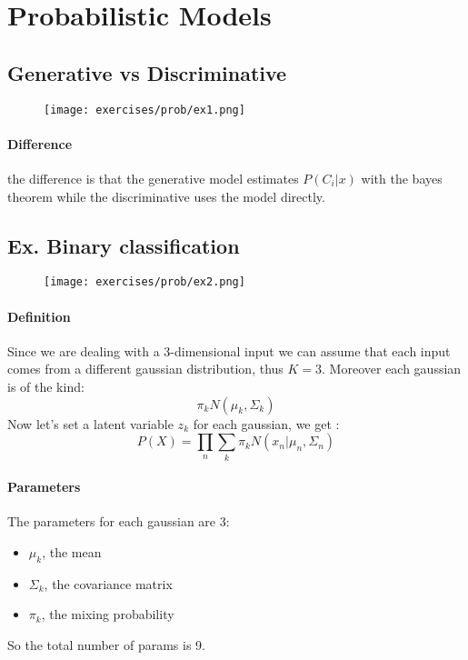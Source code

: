 \section{Probabilistic Models}

\subsection{Generative vs Discriminative}

\begin{figure}[H]
    \centering
    \texttt{[image: exercises/prob/ex1.png]}
\end{figure}

\paragraph{Difference}
the difference is that the generative model estimates $P(C_i|x)$ with the bayes theorem while the discriminative uses the model directly.


\subsection{Ex. Binary classification}

\begin{figure}[H]
    \centering
    \texttt{[image: exercises/prob/ex2.png]}
\end{figure}

\paragraph{Definition}
Since we are dealing with a 3-dimensional input we can assume that each input comes from a different gaussian distribution, thus $K=3$. Moreover each gaussian is of the kind:
$$\pi_k N(\mu_k,\Sigma_k)$$
Now let's set a latent variable $z_k$ for each gaussian, we get :
$$P(X)=\prod_n \sum_k \pi_k N(x_n|\mu_n,\Sigma_n)$$

\paragraph{Parameters}
The parameters for each gaussian are 3:
\begin{itemize}
\item $\mu_k$, the mean
\item $\Sigma_k$, the covariance matrix
\item $\pi_k$, the mixing probability
\end{itemize}
So the total number of params is 9.


